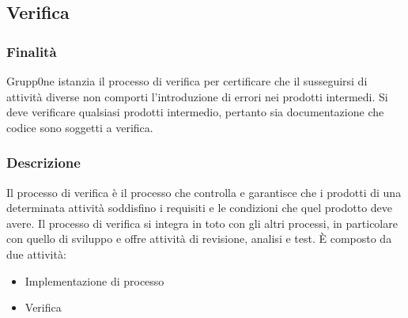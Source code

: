 \documentclass[../norme-di-progetto.tex]{subfiles}
\begin{document}
\subsection{Verifica}%
\label{sub:verifica}

\subsubsection{Finalità}%
\label{subs:verifica/finalita}

Grupp0ne istanzia il processo di verifica per certificare che il susseguirsi di attività diverse non comporti l'introduzione di errori nei prodotti intermedi.
Si deve verificare qualsiasi prodotti intermedio, pertanto sia documentazione che codice sono soggetti a verifica.

\subsubsection{Descrizione}%
\label{subs:verifica/descrizione}


Il processo di verifica è il processo che controlla e garantisce che i prodotti di una determinata attività soddisfino i requisiti e le condizioni che quel prodotto deve avere. Il processo di verifica si integra in toto con gli altri processi, in particolare con quello di sviluppo e offre attività di revisione, analisi e test. È composto da due attività:

\begin{itemize}
  \item Implementazione di processo
  \item Verifica
\end{itemize}
\end{document}
